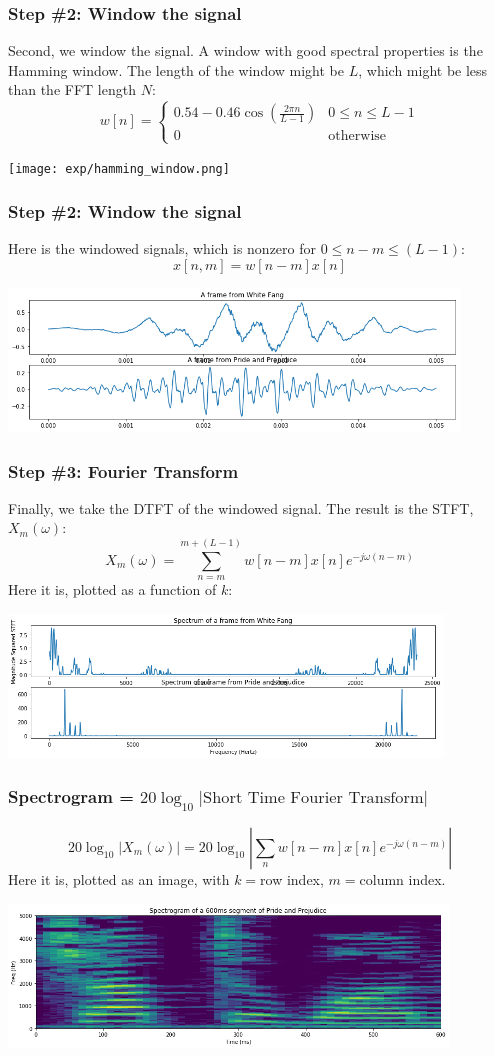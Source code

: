 \documentclass{beamer}
\begin{document}
\begin{frame}
  \frametitle{Step \#2: Window the signal}

  Second, we window the signal.  A window with good spectral
  properties is the Hamming window.  The length of the window might be
  $L$, which might be less than the FFT length $N$:
  \[
  w[n] = \begin{cases}
    0.54 - 0.46\cos\left(\frac{2\pi n}{L-1}\right) & 0\le n\le L-1\\
    0 & \mbox{otherwise}
    \end{cases}
  \]
  \centerline{\texttt{[image: exp/hamming\_window.png]}}
\end{frame}

\begin{frame}
  \frametitle{Step \#2: Window the signal}

  Here is the windowed signals, which is nonzero for $0\le n-m\le (L-1)$:
  \[
  x[n,m] = w[n-m]x[n]
  \]
  \centerline{\includegraphics[height=1.5in]{librivox_windowed.png}}
\end{frame}

\begin{frame}
  \frametitle{Step \#3: Fourier Transform}

  Finally, we take the DTFT of the windowed signal.  The result is the
  STFT, $X_m(\omega)$:
  \[
  X_m(\omega) = \sum_{n=m}^{m+(L-1)} w[n-m]x[n]e^{-j\omega (n-m)} 
  \]
  Here it is, plotted as a function of $k$:
  \centerline{\includegraphics[height=1.5in]{librivox_dftsquared.png}}
\end{frame}

\begin{frame}
  \frametitle{Spectrogram = $20\log_{10}|\mbox{Short Time Fourier Transform}|$}

  \[
  20\log_{10}|X_m(\omega)| = 20\log_{10}\left|\sum_{n}w[n-m]x[n]e^{-j\omega (n-m)}\right|
  \]
  Here it is, plotted as an image, with $k=$row index, $m=$column index.
  \centerline{\includegraphics[height=1.5in]{librivox_spectrograms.png}}
\end{frame}
\end{document}
